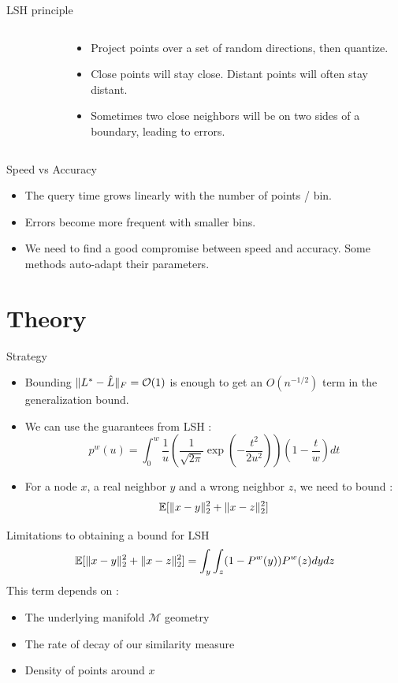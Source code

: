 \documentclass[11pt)]{beamer}
\begin{document}
\begin{frame}{LSH principle}
\begin{columns}[onlytextwidth]
\begin{column}{0.4\textwidth}
\begin{figure}
  \end{figure}
 \end{column}
 \begin{column}{0.6\textwidth}
    \begin{itemize}
      \item Project points over a set of random directions, then quantize.
      \item Close points will stay close. Distant points will often stay distant.
      \item Sometimes two close neighbors will be on two sides of a boundary, leading to errors.
    \end{itemize}
 \end{column}
\end{columns}
\end{frame}

\begin{frame}{Speed vs Accuracy}
\begin{itemize}
 \item The query time grows linearly with the number of points / bin.
 \item Errors become more frequent with smaller bins. 
 \item We need to find a good compromise between speed and accuracy. Some methods auto-adapt their parameters.
\end{itemize}
\end{frame}

\section{Theory}
\begin{frame}{Strategy}
\begin{itemize}
 \item Bounding $\Arrowvert L^*-\hat{L}\Arrowvert_F=\mathcal{O}(1)$ is enough to get an $O(n^{-1/2})$ term in the generalization bound.
 \item We can use the guarantees from LSH :
 $$p^w(u) = \int_0^w \frac{1}{u}\left( \frac{1}{\sqrt{2\pi}}\exp(-\frac{t^2}{2u^2})\right)\left(1-\frac{t}{w}\right)dt$$
 \item For a node $x$, a real neighbor $y$ and a wrong neighbor $z$, we need to bound : 
 $$\mathbb{E}[\Arrowvert x-y\Arrowvert_2^2 + \Arrowvert x-z\Arrowvert_2^2]$$
\end{itemize}

\end{frame}

\begin{frame}{Limitations to obtaining a bound for LSH}
$$\mathbb{E}[\Arrowvert x-y\Arrowvert_2^2 + \Arrowvert x-z\Arrowvert_2^2] = \int_y \int_z (1-P^w(y))P^w(z)dydz$$
This term depends on :
\begin{itemize}
 \item The underlying manifold $\mathcal{M}$ geometry
 \item The rate of decay of our similarity measure
 \item Density of points around $x$
\end{itemize}
\end{frame}
\end{document}
